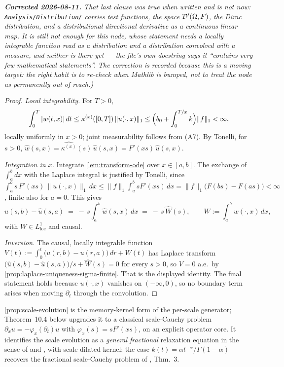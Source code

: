 \begin{proposition}
\emph{\textbf{Corrected 2026-08-11.} That last clause was true when written and is not now:
\texttt{Analysis/Distribution/} carries test functions, the space $\mathcal{D}'(\Omega,F)$, the Dirac
distribution, and a distributional directional derivative as a continuous linear map. It is
still not enough for this node, whose statement needs a locally integrable function read as a
distribution and a distribution convolved with a measure, and neither is there yet --- the file's
own docstring says it ``contains very few mathematical statements''. The correction is recorded
because this is a moving target: the right habit is to re-check when Mathlib is bumped, not to
treat the node as permanently out of reach.)}
\end{proposition}

\begin{proof}
\emph{Local integrability.} For $T > 0$,
\[
  \int_0^T |w(t,x)|\,dt \le \kappa^{(x)}([0,T])\,\|u(\cdot,x)\|_1
  \le \Bigl(b_0 + \int_0^{T/x} k\Bigr)\|f\|_1 < \infty,
\]
locally uniformly in $x > 0$; joint measurability follows from (A7). By Tonelli, for $s > 0$,
$\hat w(s, x) = \widehat{\kappa^{(x)}}(s)\,\hat u(s, x) = F'(xs)\,\hat u(s, x)$.

\emph{Integration in $x$.} Integrate \ref{lem:transform-ode} over $x \in [a, b]$. The exchange of $\int_a^b dx$
with the Laplace integral is justified by Tonelli, since
$\int_a^b s\,F'(xs)\,\|u(\cdot,x)\|_1\,dx \le \|f\|_1 \int_a^b s F'(xs)\,dx
= \|f\|_1\bigl(F(bs) - F(as)\bigr) < \infty$, finite also for $a = 0$. This gives
\[
  \hat u(s, b) - \hat u(s, a) \;=\; -\,s \int_a^b \hat w(s, x)\,dx \;=\; -\,s\,\widehat{W}(s),
  \qquad W := \int_a^b w(\cdot, x)\,dx,
\]
with $W \in L^1_{\mathrm{loc}}$ and causal.

\emph{Inversion.} The causal, locally integrable function
$V(t) := \int_0^t \bigl(u(r, b) - u(r, a)\bigr)\,dr + W(t)$ has Laplace transform
$\bigl(\hat u(s,b) - \hat u(s,a)\bigr)/s + \widehat W(s) = 0$ for every $s > 0$, so $V = 0$
a.e.\ by \ref{prop:laplace-uniqueness-sigma-finite}. That is the displayed identity. The final statement
holds because $u(\cdot, x)$ vanishes on $(-\infty, 0)$, so no boundary term arises when moving
$\partial_t$ through the convolution.
\end{proof}

\begin{remark}\label{rem:general-fractional}
\ref{prop:scale-evolution} is the memory-kernel form of the per-scale generator; Theorem~10.4
below upgrades it to a classical scale-Cauchy problem
$\partial_x u = -\varphi_x(\partial_t)u$ with $\varphi_x(s) = sF'(xs)$, on an explicit operator
core. It identifies the scale evolution as a \emph{general fractional} relaxation equation in
the sense of  and , with scale-dilated
kernel; the case $k(t) = \alpha t^{-\alpha}/\Gamma(1-\alpha)$ recovers the fractional
scale-Cauchy problem of , Thm.~3.
\end{remark}

